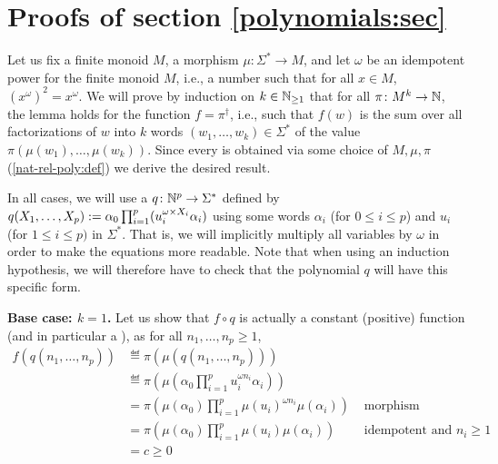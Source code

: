 
\section{Proofs of section \ref{polynomials:sec}}

\begin{proofof}
	Let us fix a finite monoid $M$, a morphism $\mu \colon \Sigma^* \to M$, and
	let $\omega$ be an idempotent power for the finite monoid $M$,
	i.e., a number such that for all $x \in M$,
	$(x^{\omega})^2 = x^{\omega}$.
	We will prove by induction on $k \in \mathbb{N}_{\geq 1}$
	that for all
	$\pi \colon M^k \to \mathbb{N}$,
	the lemma holds for the function
	$f = \pi^\dagger$, i.e., such that
	$f(w)$ is the sum over all factorizations of $w$
	into $k$ words $(w_1, \dots, w_k) \in \Sigma^*$
	of the value $\pi(\mu(w_1), \dots, \mu(w_k))$.
	Since every 
	is obtained via some choice of $M, \mu, \pi$ (\cref{nat-rel-poly:def})
	we derive the desired result.

	In all cases, we will use a  $q \colon \mathbb{N}^p \to
		\Sigma^*$ defined by $q(X_1, \dots, X_p) \mathrel{:=} \alpha_0 \prod_{i = 1}^p
		(u_i^{\omega \times X_i} \alpha_i)$ using some words $\alpha_i$ (for $0 \leq i
		\leq p$) and $u_i$ (for $1 \leq i \leq p)$ in $\Sigma^*$. That is, we will
	implicitly multiply all variables by $\omega$ in order to make the
	equations more readable. Note that when using an induction hypothesis, we
	will therefore have to check that the polynomial $q$ will have this
	specific form.

	\textbf{Base case: $k = 1$.}
	Let us show that $f \circ q$ is
	actually a constant (positive) function (and in particular a ), as for
	all $n_1, \dots, n_p \geq 1$,
	\begin{align*}
		f(q(n_1, \dots, n_p))
		 & \eqdef \pi\left(\mu(q(n_1, \dots, n_p))\right)                                      \\
		 & \eqdef \pi\left(\mu(\alpha_0 \prod_{i = 1}^p u_i^{\omega n_i} \alpha_i)\right)
		\\
		 & = \pi\left(\mu(\alpha_0) \prod_{i = 1}^p \mu(u_i)^{\omega n_i} \mu(\alpha_i)\right)
		 & \text{ morphism }
		\\
		 & = \pi\left(\mu(\alpha_0) \prod_{i = 1}^p \mu(u_i) \mu(\alpha_i)\right)
		 & \text{ idempotent and } n_i \geq 1                                                  \\
		 & = c \geq 0
	\end{align*}


\end{proofof}

